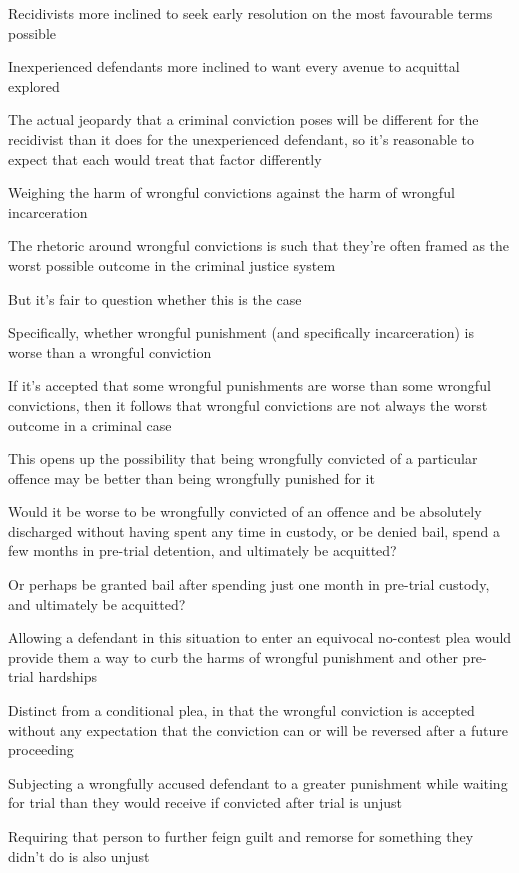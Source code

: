 Recidivists more inclined to seek early resolution on the most favourable terms possible

Inexperienced defendants more inclined to want every avenue to acquittal explored

The actual jeopardy that a criminal conviction poses will be different for the recidivist than it does for the unexperienced defendant, so it's reasonable to expect that each would treat that factor differently

Weighing the harm of wrongful convictions against the harm of wrongful incarceration

The rhetoric around wrongful convictions is such that they're often framed as the worst possible outcome in the criminal justice system

But it's fair to question whether this is the case

Specifically, whether wrongful punishment (and specifically incarceration) is worse than a wrongful conviction

If it's accepted that some wrongful punishments are worse than some wrongful convictions, then it follows that wrongful convictions are not always the worst outcome in a criminal case

This opens up the possibility that being wrongfully convicted of a particular offence may be better than being wrongfully punished for it

Would it be worse to be wrongfully convicted of an offence and be absolutely discharged without having spent any time in custody, or be denied bail, spend a few months in pre-trial detention, and ultimately be acquitted?

Or perhaps be granted bail after spending just one month in pre-trial custody, and ultimately be acquitted?

Allowing a defendant in this situation to enter an equivocal no-contest plea would provide them a way to curb the harms of wrongful punishment and other pre-trial hardships

Distinct from a conditional plea, in that the wrongful conviction is accepted without any expectation that the conviction can or will be reversed after a future proceeding

Subjecting a wrongfully accused defendant to a greater punishment while waiting for trial than they would receive if convicted after trial is unjust

Requiring that person to further feign guilt and remorse for something they didn't do is also unjust

